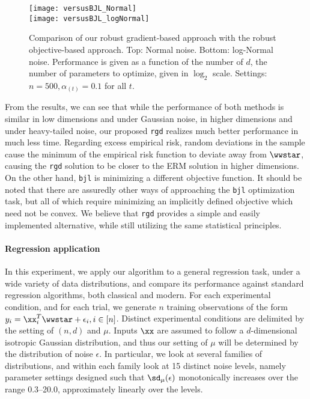 \documentclass[11pt,oneside]{article}
\theoremstyle{definition} \newtheorem{defn}{Definition}       %
\theoremstyle{plain} \newtheorem{prop}[defn]{Proposition}           %
\theoremstyle{plain} \newtheorem{thm}[defn]{Theorem}                %
\theoremstyle{plain} \newtheorem{lem}[defn]{Lemma}                  %
\theoremstyle{plain} \newtheorem{cor}[defn]{Corollary}              %
\theoremstyle{remark} \newtheorem{rmk}[defn]{Remark}                %
\theoremstyle{remark} \newtheorem{ex}[defn]{Example}                %
\begin{document}
\begin{figure}[t]
\centering
\texttt{[image: versusBJL\_Normal]}\\
\texttt{[image: versusBJL\_logNormal]}
\caption{Comparison of our robust gradient-based approach with the robust objective-based approach. Top: Normal noise. Bottom: log-Normal noise. Performance is given as a function of the number of $d$, the number of parameters to optimize, given in $\log_{2}$ scale. Settings: $n = 500, \alpha_{(t)}=0.1$ for all $t$.}
\label{fig:versusBJL}
\end{figure}

From the results, we can see that while the performance of both methods is similar in low dimensions and under Gaussian noise, in higher dimensions and under heavy-tailed noise, our proposed \texttt{rgd} realizes much better performance in much less time. Regarding excess empirical risk, random deviations in the sample cause the minimum of the empirical risk function to deviate away from $\wwstar$, causing the \texttt{rgd} solution to be closer to the ERM solution in higher dimensions. On the other hand, \texttt{bjl} is minimizing a different objective function. It should be noted that there are assuredly other ways of approaching the \texttt{bjl} optimization task, but all of which require minimizing an implicitly defined objective which need not be convex. We believe that \texttt{rgd} provides a simple and easily implemented alternative, while still utilizing the same statistical principles.


\paragraph{Regression application}

In this experiment, we apply our algorithm to a general regression task, under a wide variety of data distributions, and compare its performance against standard regression algorithms, both classical and modern. For each experimental condition, and for each trial, we generate $n$ training observations of the form $y_{i} = \xx_{i}^{T}\wwstar + \epsilon_{i}, i \in [n]$. Distinct experimental conditions are delimited by the setting of $(n,d)$ and $\mu$. Inputs $\xx$ are assumed to follow a $d$-dimensional isotropic Gaussian distribution, and thus our setting of $\mu$ will be determined by the distribution of noise $\epsilon$. In particular, we look at several families of distributions, and within each family look at 15 distinct noise levels, namely parameter settings designed such that $\sd_{\mu}(\epsilon)$ monotonically increases over the range 0.3--20.0, approximately linearly over the levels.
\end{document}
